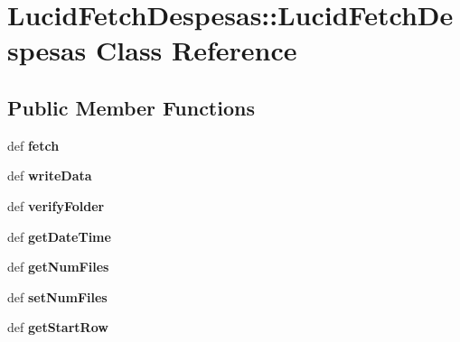 \hypertarget{classLucidFetchDespesas_1_1LucidFetchDespesas}{
\section{LucidFetchDespesas::LucidFetchDespesas Class Reference}
\label{classLucidFetchDespesas_1_1LucidFetchDespesas}
}
\subsection*{Public Member Functions}
\begin{DoxyCompactItemize}
\item 
\hypertarget{classLucidFetchDespesas_1_1LucidFetchDespesas_ad597c2c359c939d52edccb485d56f7d0}{
def {\bfseries fetch}}
\label{classLucidFetchDespesas_1_1LucidFetchDespesas_ad597c2c359c939d52edccb485d56f7d0}

\item 
\hypertarget{classLucidFetchDespesas_1_1LucidFetchDespesas_a03af72e5b5479e6f52441b7015b152b8}{
def {\bfseries writeData}}
\label{classLucidFetchDespesas_1_1LucidFetchDespesas_a03af72e5b5479e6f52441b7015b152b8}

\item 
\hypertarget{classLucidFetchDespesas_1_1LucidFetchDespesas_a4586faacbc07dcadd355212e3c56e216}{
def {\bfseries verifyFolder}}
\label{classLucidFetchDespesas_1_1LucidFetchDespesas_a4586faacbc07dcadd355212e3c56e216}

\item 
\hypertarget{classLucidFetchDespesas_1_1LucidFetchDespesas_afb3ef9dd9da323a57e1e86da79eca5b3}{
def {\bfseries getDateTime}}
\label{classLucidFetchDespesas_1_1LucidFetchDespesas_afb3ef9dd9da323a57e1e86da79eca5b3}

\item 
\hypertarget{classLucidFetchDespesas_1_1LucidFetchDespesas_a680e978861977f49ce1a5c05ead803bf}{
def {\bfseries getNumFiles}}
\label{classLucidFetchDespesas_1_1LucidFetchDespesas_a680e978861977f49ce1a5c05ead803bf}

\item 
\hypertarget{classLucidFetchDespesas_1_1LucidFetchDespesas_a549be100726ddac5f1908e6b8e94bcc7}{
def {\bfseries setNumFiles}}
\label{classLucidFetchDespesas_1_1LucidFetchDespesas_a549be100726ddac5f1908e6b8e94bcc7}

\item 
\hypertarget{classLucidFetchDespesas_1_1LucidFetchDespesas_af792cf49820708db57e4f00ebc95c5ca}{
def {\bfseries getStartRow}}
\label{classLucidFetchDespesas_1_1LucidFetchDespesas_af792cf49820708db57e4f00ebc95c5ca}


\end{DoxyCompactItemize}
